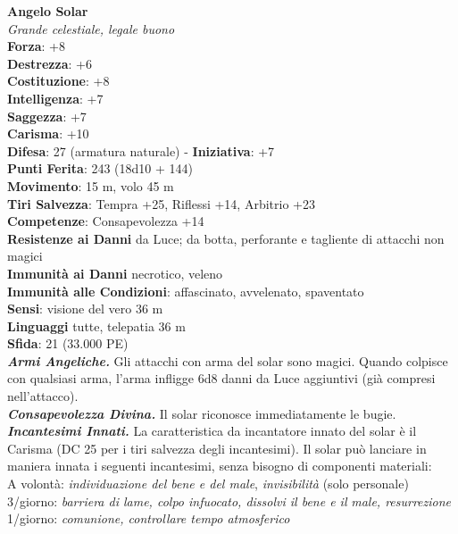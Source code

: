 \begin{multicols}{2}
\medskip\textbf{Angelo Solar}\\
\emph{Grande celestiale, legale buono}\\
\textbf{Forza}: +8\\
\textbf{Destrezza}: +6\\
\textbf{Costituzione}: +8\\
\textbf{Intelligenza}: +7\\
\textbf{Saggezza}: +7\\
\textbf{Carisma}: +10\\
\textbf{Difesa}: 27 (armatura naturale) - \textbf{Iniziativa}: +7\\
\textbf{Punti Ferita}: 243 (18d10 + 144)\\
\textbf{Movimento}: 15 m, volo 45 m\\
\textbf{Tiri Salvezza}: Tempra +25, Riflessi +14, Arbitrio +23\\
\textbf{Competenze}: Consapevolezza +14\\
\textbf{Resistenze ai Danni} da Luce; da botta, perforante e tagliente di attacchi non magici\\
\textbf{Immunità ai Danni} necrotico, veleno\\
\textbf{Immunità alle Condizioni}: affascinato, avvelenato, spaventato\\
\textbf{Sensi}: visione del vero 36 m\\
\textbf{Linguaggi} tutte, telepatia 36 m\\
\textbf{Sfida}: 21 (33.000 PE)\smallskip\\
\emph{\textbf{Armi Angeliche.}} Gli attacchi con arma del solar sono magici. Quando colpisce con qualsiasi arma, l'arma infligge 6d8 danni da Luce aggiuntivi (già compresi nell'attacco).\\
\emph{\textbf{Consapevolezza Divina.}} Il solar riconosce immediatamente le bugie.\\
\emph{\textbf{Incantesimi Innati.}} La caratteristica da incantatore innato del solar è il Carisma (DC 25 per i tiri salvezza degli incantesimi). Il solar può lanciare in maniera innata i seguenti incantesimi, senza bisogno di componenti materiali:\\
A volontà: \emph{individuazione del bene e del male}, \emph{invisibilità} (solo personale)\\
3/giorno: \emph{barriera di lame, colpo infuocato, dissolvi il bene e il} \emph{male, resurrezione}\\
1/giorno: \emph{comunione, controllare tempo atmosferico}\\

\end{multicols}
